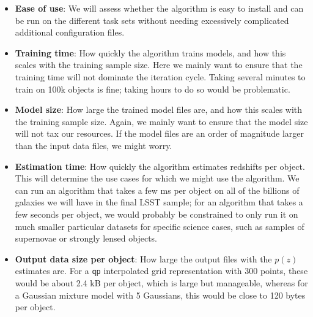 \begin{itemize}
\item{\textbf{Ease of use}: We will assess whether the algorithm is easy to
    install and can be run on the different task sets without needing
    excessively complicated additional configuration files.}
\item{\textbf{Training time}: How quickly the algorithm trains models,
    and how this scales with the training sample size. Here we
    mainly want to ensure that the training time will not dominate the
    iteration cycle. Taking several minutes to train on 100k objects
    is fine; taking hours to do so would be problematic.}
\item{\textbf{Model size}: How large the trained model files are,
    and how this scales with the training sample size. Again, we
    mainly want to ensure that the model size will not tax our resources.
    If the model files are an order of magnitude larger than the input
    data files, we might worry.}
\item{\textbf{Estimation time}: How quickly the algorithm estimates
    redshifts per object. This will determine the use cases for
    which we might use the algorithm. We can run an algorithm that
    takes a few ms per object on all of the billions of galaxies we
    will have in the final LSST sample; for an algorithm that takes a
    few seconds per object, we would probably be constrained to only
    run it on much smaller particular datasets for specific science
    cases, such as samples of supernovae or strongly lensed objects.}
\item{\textbf{Output data size per object}: How large the output
    files with the $p(z)$ estimates are. For a \texttt{qp}
    interpolated grid representation with 300 points, these
    would be about 2.4 kB per object, which is large but manageable,
    whereas for a Gaussian mixture model with 5 Gaussians, this would
    be close to 120 bytes per object.}
\end{itemize}









